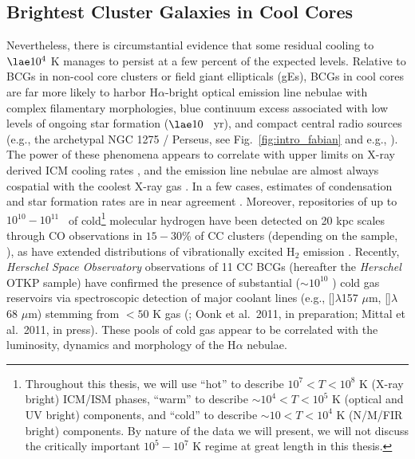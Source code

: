 \subsection{Brightest Cluster Galaxies in Cool Cores}


Nevertheless,  there  is  circumstantial  evidence that  some  residual cooling
to $\lae 10^4$ K
manages to persist at a  few percent of the expected levels.  Relative
to BCGs  in non-cool core  clusters or field giant  ellipticals (gEs),
BCGs  in cool  cores are  far more  likely to  harbor H$\alpha$-bright
optical emission  line nebulae with  complex filamentary morphologies,
blue  continuum excess  associated  with low  levels  of ongoing  star
formation  ($\lae  10$  \Msol\  yr\mone), and  compact  central  radio
sources (e.g., the archetypal NGC 1275 / Perseus, see Fig.~\ref{fig:intro_fabian} and e.g.,
\citealt{minkowski57,lynds70,sabra00,conselice01,fabian03}).  The power of these phenomena appears to correlate with upper
limits      on      X-ray      derived     ICM      cooling      rates
\citep{hu85,odea87,heckman89,mcnamara04,rafferty06,salome06,quillen08,odea08},
and the  emission line  nebulae are almost  always cospatial  with the
coolest  X-ray gas  \citep{crawford95,crawford05,fabian03}.
In a few cases, estimates of condensation and star formation rates 
are in near agreement \citep{odea08}. 
Moreover,
repositories  of  up to  $10^{10}-10^{11}$  \Msol\  of cold\footnote{Throughout this thesis,
we will use ``hot'' to describe $10^7 < T < 10^8$ K (X-ray bright) ICM/ISM
phases, ``warm'' to describe $\sim10^4 < T < 10^5$ K (optical and UV bright)
components, and ``cold'' to describe $\sim10<T<10^4$ K (N/M/FIR bright)
components. By nature of the data we will present, we will not discuss the
critically important $10^5-10^7$ K regime at great length in this thesis.}  molecular
hydrogen have been  detected on 20 kpc scales  through CO observations
in   $15-30$\%   of   CC    clusters   (depending   on   the   sample,
\citealt{edge01,edge03,salome06}),  as have extended  distributions of
vibrationally             excited            H$_2$            emission
\citep{donahue00,jaffe01,egami06,wilman09}.  Recently,  {\it  Herschel
  Space Observatory}  observations of 11  CC BCGs (hereafter  the {\it
  Herschel} OTKP  sample) have  confirmed the presence  of substantial
($\sim10^{10}$ \Msol) cold  gas reservoirs via spectroscopic detection
of  major   coolant  lines  (e.g.,   []$\lambda$157  $\mu$m,
[]$\lambda$68   $\mu$m)   stemming    from   $<50$   K   gas
(\citealt{edge10spec,edge10phot}; Oonk et al.~2011, in preparation;   Mittal   et  al.~2011,   in
press). These pools of cold gas appear to be correlated with the luminosity, dynamics 
and morphology of the H$\alpha$ nebulae. 








